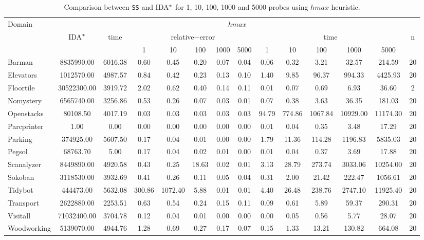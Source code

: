 \begin{table}[]
\footnotesize\setlength{\tabcolsep}{1.2pt}
\centering
\caption{Comparison between \texttt{SS} and IDA$\sp{*}$ for 1, 10, 100, 1000 and 5000 probes using $hmax$ heuristic.}
\label{tb:comparison}
\begin{tabular}{lccccccccccccc}
\hline
\multirow{3}{*}{Domain} & \multicolumn{13}{c}{$hmax$}                                                                                                                     \\ \cline{2-14} 
                        & \multirow{2}{*}{IDA$\sp{*}$} & \multirow{2}{*}{time} & \multicolumn{5}{c}{relative$-$error} & \multicolumn{5}{c}{time}   & \multirow{2}{*}{n} \\ \cline{4-13}
                        &                              &                       & 1   & 10   & 100   & 1000   & 5000   & 1 & 10 & 100 & 1000 & 5000 &                    \\ \hline
Barman & 8835990.00& 6016.38& 0.60& 0.45& 0.20& 0.07& 0.04& 0.06& 0.32& 3.21& 32.57& 214.59& 20\\
Elevators & 1012570.00& 4987.57& 0.84& 0.42& 0.23& 0.13& 0.10& 1.40& 9.85& 96.37& 994.33& 4425.93& 20\\
Floortile & 30522300.00& 3919.72& 2.02& 0.62& 0.40& 0.14& 0.11& 0.01& 0.07& 0.69& 6.93& 36.60& 2\\
Nomystery & 6565740.00& 3256.86& 0.53& 0.26& 0.07& 0.03& 0.01& 0.07& 0.38& 3.63& 36.35& 181.03& 20\\
Openstacks & 80108.50& 4017.19& 0.03& 0.03& 0.03& 0.03& 0.03& 94.79& 774.86& 1067.84& 10929.00& 11174.30& 20\\
Parcprinter & 1.00& 0.00& 0.00& 0.00& 0.00& 0.00& 0.00& 0.01& 0.04& 0.35& 3.48& 17.29& 20\\
Parking & 374925.00& 5607.50& 0.17& 0.04& 0.01& 0.00& 0.00& 1.79& 11.36& 114.28& 1196.83& 5835.03& 20\\
Pegsol & 68763.70& 5.00& 0.17& 0.04& 0.02& 0.01& 0.00& 0.01& 0.04& 0.37& 3.69& 17.88& 20\\
Scanalyzer & 8449890.00& 4920.58& 0.43& 0.25& 18.63& 0.02& 0.01& 3.13& 28.79& 273.74& 3033.06& 10254.00& 20\\
Sokoban & 3118530.00& 3932.69& 0.41& 0.26& 0.11& 0.05& 0.04& 0.31& 2.00& 21.42& 222.47& 1056.61& 20\\
Tidybot & 444473.00& 5632.08& 300.86& 1072.40& 5.88& 0.01& 0.01& 4.40& 26.48& 238.76& 2747.10& 11925.40& 20\\
Transport & 2622880.00& 2253.51& 0.63& 0.54& 0.24& 0.15& 0.11& 0.09& 0.61& 5.89& 59.37& 290.31& 20\\
Visitall & 71032400.00& 3704.78& 0.12& 0.04& 0.01& 0.00& 0.00& 0.00& 0.05& 0.56& 5.77& 28.07& 20\\
Woodworking & 5139070.00& 4944.76& 1.28& 0.69& 0.27& 0.17& 0.07& 0.15& 1.33& 13.21& 130.82& 664.08& 20\\ \hline
\end{tabular}
\end{table}

